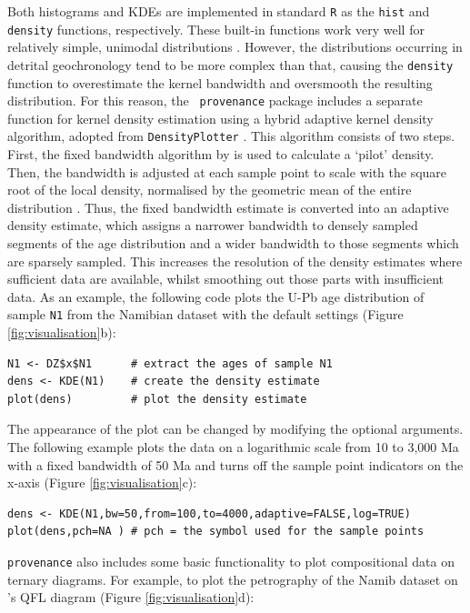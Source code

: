 \documentclass{article}
\begin{document}
Both histograms and KDEs are implemented in standard {\tt R} as the
{\tt hist} and {\tt density} functions, respectively. These built-in
functions work very well for relatively simple, unimodal distributions
\citep{silverman1986}. However, the distributions occurring in
detrital geochronology tend to be more complex than that, causing the
{\tt density} function to overestimate the kernel bandwidth and
oversmooth the resulting distribution. For this reason, the {\tt
  provenance} package includes a separate function for kernel density
estimation using a hybrid adaptive kernel density algorithm, adopted
from {\tt DensityPlotter} \citep[version 3.0 and
  above,][]{vermeesch2012b}. This algorithm consists of two
steps. First, the fixed bandwidth algorithm by \citet{botev2010} is
used to calculate a `pilot' density.  Then, the bandwidth is adjusted
at each sample point to scale with the square root of the local
density, normalised by the geometric mean of the entire distribution
\citep{abramson1982}. Thus, the fixed bandwidth estimate is converted
into an adaptive density estimate, which assigns a narrower bandwidth
to densely sampled segments of the age distribution and a wider
bandwidth to those segments which are sparsely sampled. This increases
the resolution of the density estimates where sufficient data are
available, whilst smoothing out those parts with insufficient data. As
an example, the following code plots the U-Pb age distribution of
sample {\tt N1} from the Namibian dataset with the default settings
(Figure \ref{fig:visualisation}b):

\begin{verbatim}
N1 <- DZ$x$N1      # extract the ages of sample N1
dens <- KDE(N1)    # create the density estimate
plot(dens)         # plot the density estimate
\end{verbatim}

The appearance of the plot can be changed by modifying the optional
arguments. The following example plots the data on a logarithmic scale
from 10 to 3,000 Ma with a fixed bandwidth of 50 Ma and turns off the
sample point indicators on the x-axis (Figure \ref{fig:visualisation}c):

\begin{verbatim}
dens <- KDE(N1,bw=50,from=100,to=4000,adaptive=FALSE,log=TRUE)
plot(dens,pch=NA ) # pch = the symbol used for the sample points
\end{verbatim}

{\tt provenance} also includes some basic functionality to plot
compositional data on ternary diagrams. For example, to plot the
petrography of the Namib dataset on \citet{dickinson1983}'s QFL
diagram (Figure \ref{fig:visualisation}d):
\end{document}
